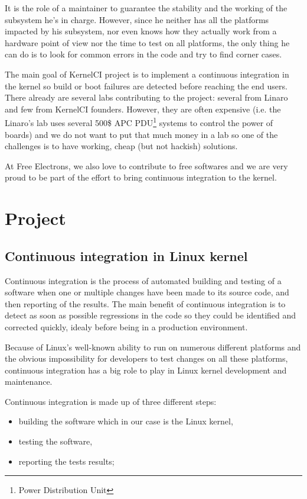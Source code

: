 It is the role of a maintainer to guarantee the stability and the working of the subsystem he's in charge. However, since he neither has all the platforms impacted by his subsystem, nor even knows how they actually work from a hardware point of view nor the time to test on all platforms, the only thing he can do is to look for common errors in the code and try to find corner cases.

The main goal of KernelCI project is to implement a continuous integration in the kernel so build or boot failures are detected before reaching the end users. There already are several labs contributing to the project: several from Linaro and few from KernelCI founders. However, they are often expensive (i.e. the Linaro's lab uses several 500\$ APC PDU\footnote{Power Distribution Unit} systems to control the power of boards) and we do not want to put that much money in a lab so one of the challenges is to have working, cheap (but not hackish) solutions.

At Free Electrons, we also love to contribute to free softwares and we are very proud to be part of the effort to bring continuous integration to the kernel.

\section{Project}
\subsection{Continuous integration in Linux kernel}

Continuous integration is the process of automated building and testing of a software when one or multiple changes have been made to its source code, and then reporting of the results. The main benefit of continuous integration is to detect as soon as possible regressions in the code so they could be identified and corrected quickly, idealy before being in a production environment.

Because of Linux's well-known ability to run on numerous different platforms and the obvious impossibility for developers to test changes on all these platforms, continuous integration has a big role to play in Linux kernel development and maintenance.

Continuous integration is made up of three different steps:
\begin{itemize}
  \item building the software which in our case is the Linux kernel,
  \item testing the software,
  \item reporting the tests results;
\end{itemize}

